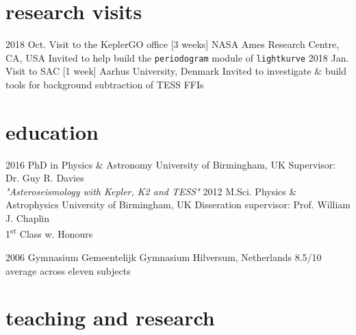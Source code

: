 \documentclass[]{k-cv} %
\begin{document}
\section{research visits}
\begin{entrylist}
\entry
{2018 Oct.}
{Visit to the KeplerGO office [3 weeks]}
{NASA Ames Research Centre, CA, USA}
{Invited to help build the \texttt{periodogram} module of \texttt{lightkurve}}
\entry
{2018 Jan.}
{Visit to SAC [1 week]}
{Aarhus University, Denmark}
{Invited to investigate \& build tools for background subtraction of TESS FFIs}
\end{entrylist}

\clearpage
{}


\section{education}

\begin{entrylist}
\entry
{2016 }
{PhD {\normalfont in Physics \& Astronomy}}
{University of Birmingham, UK}
{Supervisor: Dr. Guy R. Davies\\
\emph{"Asteroseismology with \textit{Kepler}, K2 and TESS"} \vspace{0.2cm}}
\entry
{2012 }
{M.Sci. {\normalfont Physics \& Astrophysics}}
{University of Birmingham, UK}
{Disseration supervisor: Prof. William J. Chaplin\\
1\textsuperscript{st} Class w. Honours\vspace{0.2cm}}


\entry
{2006 }
{Gymnasium}
{Gemeentelijk Gymnasium Hilversum, Netherlands}
{8.5/10 average across eleven subjects}
\end{entrylist}


\section{teaching and research}
\end{document}
